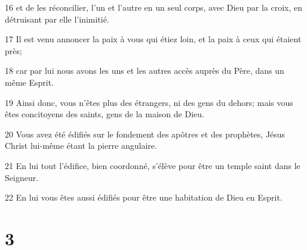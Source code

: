 \par 16 et de les réconcilier, l'un et l'autre en un seul corps, avec Dieu par la croix, en détruisant par elle l'inimitié.
\par 17 Il est venu annoncer la paix à vous qui étiez loin, et la paix à ceux qui étaient près;
\par 18 car par lui nous avons les uns et les autres accès auprès du Père, dans un même Esprit.
\par 19 Ainsi donc, vous n'êtes plus des étrangers, ni des gens du dehors; mais vous êtes concitoyens des saints, gens de la maison de Dieu.
\par 20 Vous avez été édifiés sur le fondement des apôtres et des prophètes, Jésus Christ lui-même étant la pierre angulaire.
\par 21 En lui tout l'édifice, bien coordonné, s'élève pour être un temple saint dans le Seigneur.
\par 22 En lui vous êtes aussi édifiés pour être une habitation de Dieu en Esprit.

\chapter{3}

